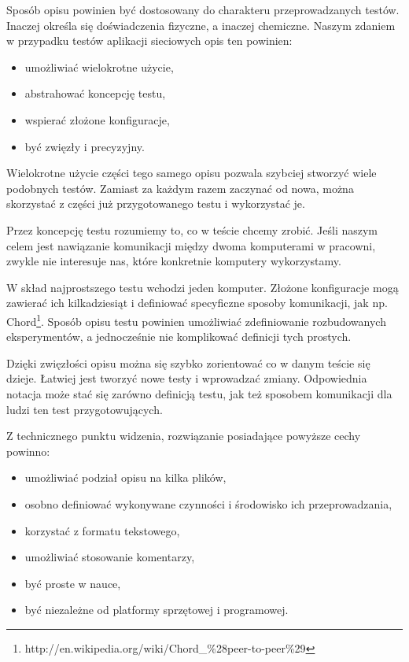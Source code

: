 \documentclass[00-praca-magisterska.tex]{subfiles}
\begin{document}
Sposób opisu powinien być dostosowany do charakteru przeprowadzanych testów.
Inaczej określa się doświadczenia fizyczne, a inaczej chemiczne. Naszym
zdaniem w przypadku testów aplikacji sieciowych opis ten powinien:
\begin{itemize}
\item umożliwiać wielokrotne użycie,
\item abstrahować koncepcję testu,
\item wspierać złożone konfiguracje,
\item być zwięzły i precyzyjny.
\end{itemize}

Wielokrotne użycie części tego samego opisu pozwala szybciej stworzyć wiele
podobnych testów. Zamiast za każdym razem zaczynać od nowa, można skorzystać z
części już przygotowanego testu i wykorzystać je.

Przez koncepcję testu rozumiemy to, co w teście chcemy zrobić. Jeśli naszym
celem jest nawiązanie komunikacji między dwoma komputerami w pracowni, zwykle
nie interesuje nas, które konkretnie komputery wykorzystamy.

W skład najprostszego testu wchodzi jeden komputer. Złożone konfiguracje mogą
zawierać ich kilkadziesiąt i definiować specyficzne sposoby komunikacji, jak
np. Chord\footnote{http://en.wikipedia.org/wiki/Chord\_\%28peer-to-peer\%29}.
Sposób opisu testu powinien umożliwiać zdefiniowanie rozbudowanych
eksperymentów, a jednocześnie nie komplikować definicji tych prostych.

Dzięki zwięzłości opisu można się szybko zorientować co w danym teście się
dzieje. Łatwiej jest tworzyć nowe testy i wprowadzać zmiany. Odpowiednia
notacja może stać się zarówno definicją testu, jak też sposobem komunikacji
dla ludzi ten test przygotowujących.

Z technicznego punktu widzenia, rozwiązanie posiadające powyższe cechy
powinno:
\begin{itemize}
\item umożliwiać podział opisu na kilka plików,
\item osobno definiować wykonywane czynności i środowisko ich przeprowadzania,
\item korzystać z formatu tekstowego,
\item umożliwiać stosowanie komentarzy,
\item być proste w nauce,
\item być niezależne od platformy sprzętowej i programowej.
\end{itemize}
\end{document}
